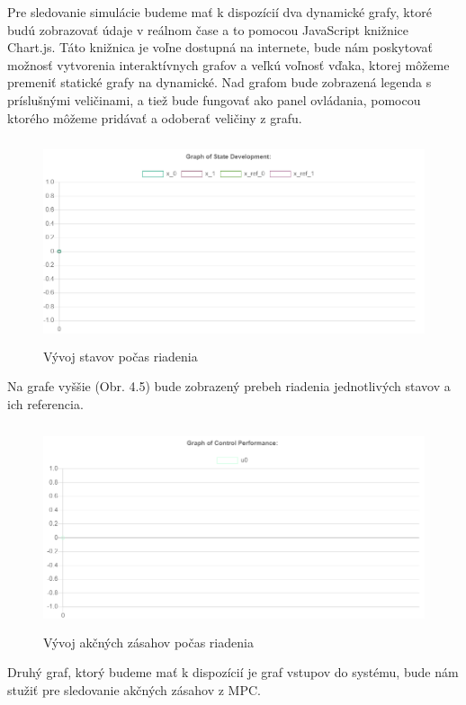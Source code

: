 Pre sledovanie simulácie budeme mať k dispozícií dva dynamické grafy, ktoré budú zobrazovať údaje v reálnom čase a to pomocou JavaScript knižnice Chart.js. Táto knižnica je voľne dostupná na internete, bude nám poskytovať možnosť vytvorenia interaktívnych grafov a veľkú voľnosť vďaka, ktorej môžeme premeniť statické grafy na dynamické. Nad grafom bude zobrazená legenda s príslušnými veličinami, a tiež bude fungovať ako panel ovládania, pomocou ktorého môžeme pridávať a odoberať veličiny z grafu. 
\begin{figure}[H]
	\centering
	\includegraphics[width=13cm,height=6cm]{images/graf_stavov}
	\caption{Vývoj stavov počas riadenia}
\end{figure}
Na grafe vyššie (Obr. 4.5) bude zobrazený prebeh riadenia jednotlivých stavov a ich referencia.
\begin{figure}[H]	
	\centering
	\includegraphics[width=13cm,height=6cm]{images/graf_vstupov}
	\caption{Vývoj akčných zásahov počas riadenia}
\end{figure}
Druhý graf, ktorý budeme mať k dispozícií je graf vstupov do systému, bude nám stužiť pre sledovanie akčných zásahov z MPC.

